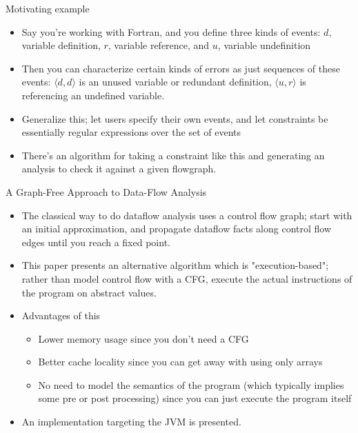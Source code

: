\documentclass{beamer}
\begin{document}
\begin{frame}{Motivating example}
\begin{itemize}
\item Say you're working with Fortran, and you define three kinds of events:
$d$, variable definition, $r$, variable reference, and $u$, variable
undefinition
\item Then you can characterize certain kinds of errors as just sequences
of these events: $\langle d, d \rangle$ is an unused variable or redundant
definition, $\langle u, r\rangle$ is referencing an undefined variable.
\item Generalize this; let users specify their own events, and let
constraints be essentially regular expressions over the set of events
\item There's an algorithm for taking a constraint like this and generating
an analysis to check it against a given flowgraph. 
\end{itemize}
\end{frame}

\begin{frame}{A Graph-Free Approach to Data-Flow Analysis}
\begin{itemize}
\item The classical way to do dataflow analysis uses a control flow graph;
start with an initial approximation, and propagate dataflow facts along
control flow edges until you reach a fixed point.
\item This paper presents an alternative algorithm which is 
"execution-based"; rather than model control flow with a CFG, execute the
actual instructions of the program on abstract values.
\item Advantages of this
    \begin{itemize}
    \item Lower memory usage since you don't need a CFG
    \item Better cache locality since you can get away with using only arrays
    \item No need to model the semantics of the program (which typically
    implies some pre or post processing) since you can just execute the program itself
\end{itemize}
\item An implementation targeting the JVM is presented.
\end{itemize}
\end{frame}
\end{document}
